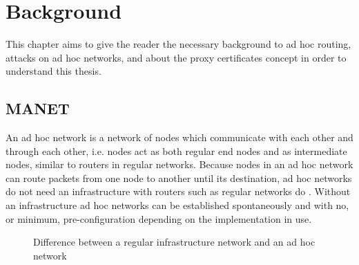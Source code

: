 \chapter{Background}
\label{ch:background}
\acresetall

This chapter aims to give the reader the necessary background to ad hoc routing,
attacks on ad hoc networks, and about the proxy certificates concept in order to
understand this thesis.

\section{\acf{MANET}}
An ad hoc network is a network of nodes which communicate with each other and
through each other, i.e. nodes act as both regular end nodes and as intermediate
nodes, similar to routers in regular networks. Because nodes in an ad hoc
network can route packets from one node to another until its destination, ad hoc
networks do not need an infrastructure with routers such as regular networks
do \cite{perkins2008ad}. Without an infrastructure ad hoc networks can be
established spontaneously and with no, or minimum, pre-configuration depending
on the implementation in use.

\begin{figure}[h]
	\centering
	\hspace{15mm}
	\caption{Difference between a regular infrastructure network and an ad hoc network}
	\label{fig:background_networks}
\end{figure}

